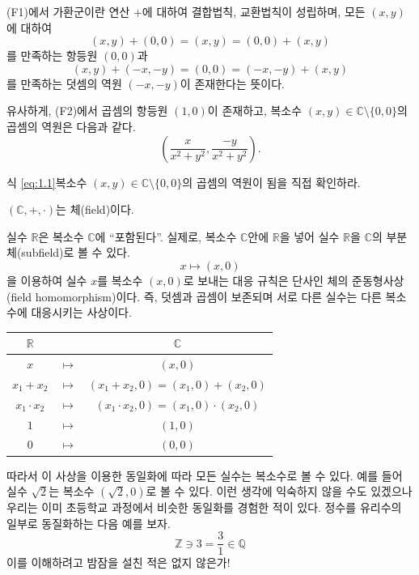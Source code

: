 (F1)에서 가환군이란
연산 $+$에 대하여 결합법칙, 교환법칙이 성립하며,
모든 $(x,y)$에 대하여
$$
(x,y) + (0,0) = (x,y) = (0,0) + (x,y)
$$
를 만족하는 
항등원 $(0,0)$과 
$$
(x,y) + (-x,-y) = (0,0) = (-x,-y) + (x,y)
$$
를 만족하는 덧셈의 역원 $(-x, -y)$이  존재한다는 뜻이다.

유사하게, (F2)에서 곱셈의 항등원 $(1,0)$이 존재하고, 복소수 $(x,y) \in \mathbb C \setminus\{0,0\}$의
곱셈의 역원은 다음과 같다.
\begin{equation} \label{eq:1.1}
\left( \dfrac{x}{x^2+y^2}, \dfrac{-y}{x^2+y^2} \right).
\end{equation}

\begin{salt_exercise}
식 \eqref{eq:1.1}\이 복소수 $(x,y) \in \mathbb C \setminus\{0,0\}$의 곱셈의 역원이 됨을 직접 확인하라.
\end{salt_exercise}


\begin{salt_prop}
$(\mathbb C, +, \cdot)$는 체(field)이다.
\end{salt_prop}

실수  $\mathbb R$은 복소수 $\mathbb C$에 ``포함된다''.
실제로, 복소수 $\mathbb C$안에 $\mathbb R$을 넣어
실수 $\mathbb R$을 $\mathbb C$의 부분체(subfield)로 볼 수 있다.
$$
x \mapsto (x,0)
$$
을 이용하여 실수 $x$를 복소수 $(x,0)$로 보내는 대응 규칙은
단사인 체의 준동형사상(field homomorphism)이다.
즉, 덧셈과 곱셈이 보존되며 서로 다른 실수는 다른 복소수에 대응시키는 사상이다.

\begin{center}
\begin{tabular}{|ccc|} \hline
$\mathbb R$ & & $\mathbb C$ \\ \hline \hline
$x$ & $\mapsto$ & $(x,0)$ \\ 
$x_1+x_2$ & $\mapsto$ & $(x_1+x_2,0) = (x_1,0) + (x_2,0)$ \\ 
$x_1\cdot x_2$ & $\mapsto$ & $(x_1\cdot x_2,0) = (x_1,0) \cdot (x_2,0)$ \\ 
$1$ & $\mapsto$ & $(1,0)$ \\
$0$ & $\mapsto$ & $(0,0)$ \\
\hline
\end{tabular}
\end{center}

따라서 이 사상을 이용한 동일화에 따라 모든 실수는 복소수로 볼 수 있다.
예를 들어 실수 $\sqrt{2}$는 복소수 $(\sqrt{2},0)$로 볼 수 있다.
이런 생각에 익숙하지 않을 수도 있겠으나 우리는 이미 초등학교 과정에서
비슷한 동일화를 경험한 적이 있다. 정수를 유리수의 일부로 동질화하는
다음 예를 보자.
$$
\mathbb Z  \ni 3 = \frac31 \in \mathbb Q
$$
이를 이해하려고 밤잠을 설친 적은 없지 않은가!

